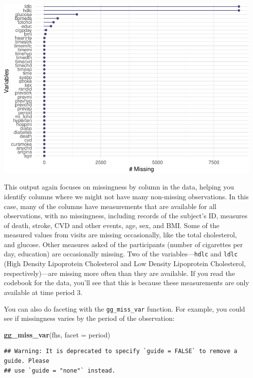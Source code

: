 \documentclass[
]{book}
\newenvironment{Shaded}{\begin{snugshade}}{\end{snugshade}}
\newcommand{\DataTypeTok}[1]{\textcolor[rgb]{0.13,0.29,0.53}{#1}}
\newcommand{\KeywordTok}[1]{\textcolor[rgb]{0.13,0.29,0.53}{\textbf{#1}}}
\newcommand{\NormalTok}[1]{#1}
\begin{document}
\includegraphics{adv_epi_analysis_files/figure-latex/unnamed-chunk-174-1.pdf}

This output again focuses on missingness by column in the data, helping you identify columns where we might not have many non-missing observations.
In this case, many of the columns have measurements that are available for all observations, with no missingness,
including records of the subject's ID, measures of death, stroke, CVD and other
events, age, sex, and BMI. Some of the measured values from visits are missing
occasionally, like the total cholesterol, and glucose. Other measures asked of
the participants (number of cigarettes per day, education) are occasionally
missing. Two of the variables---\texttt{hdlc} and \texttt{ldlc} (High Density Lipoprotein Cholesterol and Low Density Lipoprotein Cholesterol, respectively)---are missing more often than
they are available. If you read the codebook for the data, you'll see that this is because these measurements are only available at time period 3.

You can also do faceting with the \texttt{gg\_miss\_var} function. For
example, you could see if missingness varies by the period of the observation:

\begin{Shaded}
\begin{Highlighting}[]
\KeywordTok{gg_miss_var}\NormalTok{(fhs, }\DataTypeTok{facet =}\NormalTok{ period)}
\end{Highlighting}
\end{Shaded}

\begin{verbatim}
## Warning: It is deprecated to specify `guide = FALSE` to remove a guide. Please
## use `guide = "none"` instead.
\end{verbatim}
\end{document}
